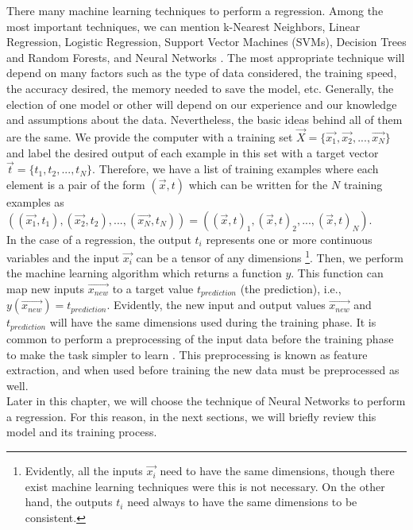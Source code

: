There many machine learning techniques to perform a regression. Among the most important techniques, we can mention k-Nearest Neighbors, Linear Regression, Logistic Regression, Support Vector Machines (SVMs), Decision Trees and Random Forests, and Neural Networks \cite{machine_mitchell}. The most appropriate technique will depend on many factors such as the type of data considered, the training speed, the accuracy desired, the memory needed to save the model, etc. Generally, the election of one model or other will depend on our experience and our knowledge and assumptions about the data. Nevertheless, the basic ideas behind all of them are the same. We provide the computer with a training set $\vec{X}= \{ \vec{x_{1}},\vec{x_{2}},...,\vec{x_{N}} \}$ and label the desired output of each example in this set with a target vector $\vec{t}= \{ t_{1},t_{2},...,t_{N} \} $. Therefore, we have a list of training examples where each element is a pair of the form $(\vec{x},t)$ which can be written for the $N$ training examples as $((\vec{x_{1}},t_{1}),(\vec{x_{2}},t_{2}),...,(\vec{x_{N}},t_{N}))=((\vec{x},t)_{1},(\vec{x},t)_{2},...,(\vec{x},t)_{N})$.\\

In the case of a regression, the output $t_{i}$ represents one or more continuous variables and the input $\vec{x_{i}}$ can be a tensor of any dimensions \footnote{Evidently, all the inputs $\vec{x_{i}}$ need to have the same dimensions, though there exist machine learning techniques were this is not necessary. On the other hand, the outputs $t_{i}$ need always to have the same dimensions to be consistent.}. Then, we perform the machine learning algorithm which returns a function $y$. This function can map new inputs $\vec{x_{new}}$ to a target value $t_{prediction}$ (the prediction), i.e., $y(\vec{x_{new}})=t_{prediction}$. Evidently, the new input and output values $\vec{x_{new}}$ and $t_{prediction}$ will have the same dimensions used during the training phase. It is common to perform a preprocessing of the input data before the training phase to make the task simpler to learn  \cite{machine_bishop}. This preprocessing is known as feature extraction, and when used before training the new data must be preprocessed as well.\\

Later in this chapter, we will choose the technique of Neural Networks to perform a regression. For this reason, in the next sections, we will briefly review this model and its training process.

